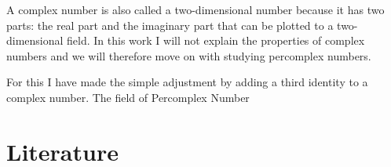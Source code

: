 \documentclass[a4paper,english,parskip]{scrartcl}
\begin{document}
	A complex number is also called a two-dimensional number because it has two parts: the real part and the 
	imaginary part that can be plotted to a two-dimensional field.
	In this work I will not explain the properties of complex numbers and we will therefore move on with 
	studying percomplex numbers.
	
	
	
	For this I have made the simple adjustment by adding a third identity to a complex number.
	The field of Percomplex Number
	
	\newpage
	\section{Literature}
	
	
	\printbibliography[type=article, title={Articles}]
	\printbibliography[type=thesis, title={Papers}]
	\printbibliography[type=inbook, title={Book Excerpts}]
	\printbibliography[type=inproceedings, title={Inproceedings}]
	
\end{document}
